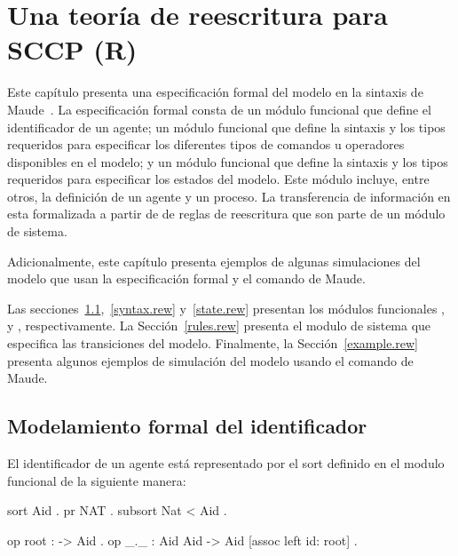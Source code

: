 \chapter{Una teor\'ia de reescritura para SCCP (R)}
\label{chapter.rew}

Este cap\'itulo presenta una especificaci\'on formal del modelo \SCCP en la sintaxis de Maude~\cite{maude-book}. La especificaci\'on formal consta de un m\'odulo funcional que define el identificador de un agente; un m\'odulo funcional que define la sintaxis y los tipos requeridos para especificar los diferentes tipos de comandos u operadores disponibles en el modelo; y un m\'odulo funcional que define la sintaxis y los tipos requeridos para especificar los estados del modelo. Este m\'odulo incluye, entre otros, la definici\'on de un agente y un proceso. La transferencia de informaci\'on en \SCCP esta formalizada a partir de de reglas de reescritura que son parte de un m\'odulo de sistema.

Adicionalmente, este cap\'itulo presenta ejemplos de algunas simulaciones del modelo que usan la especificaci\'on formal y el comando  de Maude.

Las secciones~\ref{aid.rew},~\ref{syntax.rew} y~\ref{state.rew} presentan los m\'odulos funcionales ,  y , respectivamente. La Secci\'on~\ref{rules.rew} presenta el modulo de sistema  que especifica las transiciones del modelo. Finalmente, la Secci\'on~\ref{example.rew} presenta algunos ejemplos de simulaci\'on del modelo usando el comando  de Maude.

\section{Modelamiento formal del identificador}
\label{aid.rew}

El identificador de un agente est\'a representado por el sort  definido en el modulo funcional  de la siguiente manera:

\begin{maude}
  sort Aid .
  pr NAT .
  subsort Nat < Aid .

  op root : -> Aid .
  op _._ : Aid Aid -> Aid [assoc left id: root] .
\end{maude}

